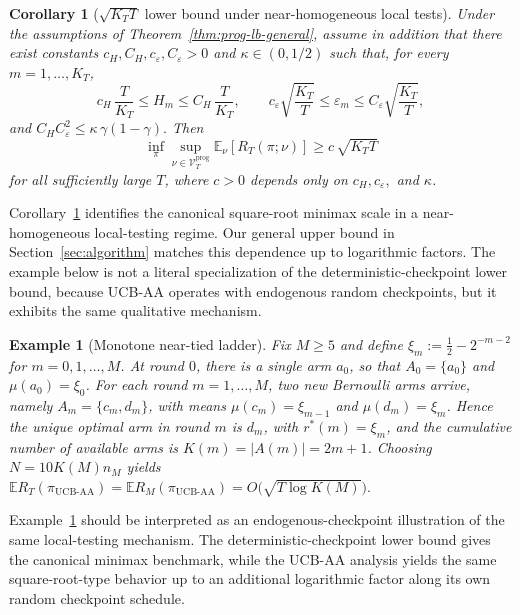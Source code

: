 \documentclass[11pt]{article}
\newtheorem{example}{Example}
\newtheorem{corollary}{Corollary}
\begin{document}
\begin{corollary}[$\sqrt{K_TT}$ lower bound under near-homogeneous local tests]
\label{cor:prog-lb-sqrtKT}
Under the assumptions of Theorem~\ref{thm:prog-lb-general}, assume in addition that there
exist constants $c_H,C_H,c_\varepsilon,C_\varepsilon>0$ and $\kappa\in(0,1/2)$ such that, for
every $m=1,\dots,K_T$,
\[
c_H\,\frac{T}{K_T}
\le
H_m
\le
C_H\,\frac{T}{K_T},
\qquad
c_\varepsilon\sqrt{\frac{K_T}{T}}
\le
\varepsilon_m
\le
C_\varepsilon\sqrt{\frac{K_T}{T}},
\]
and
\(
C_HC_\varepsilon^2\le \kappa\,\gamma(1-\gamma).
\)
Then
\[
\inf_\pi\sup_{\nu\in\mathcal V_T^{\mathrm{prog}}}
\mathbb E_\nu[R_T(\pi;\nu)]
\ge
c\,\sqrt{K_TT}
\]
for all sufficiently large $T$, where $c>0$ depends only on $c_H,c_\varepsilon,$ and $\kappa$.
\end{corollary}

Corollary~\ref{cor:prog-lb-sqrtKT} identifies the canonical square-root minimax scale in a
near-homogeneous local-testing regime. Our general upper bound in
Section~\ref{sec:algorithm} matches this dependence up to logarithmic factors. The example
below is not a literal specialization of the deterministic-checkpoint lower bound, because
UCB-AA operates with endogenous random checkpoints, but it exhibits the same qualitative
mechanism.


\begin{example}[Monotone near-tied ladder]
\label{exp:monotone-near-tied-ladder}
Fix $M\ge 5$ and define $\xi_m := \frac12 - 2^{-m-2}$ for $m=0,1,\dots,M$. At round $0$,
there is a single arm $a_0$, so that $A_0=\{a_0\}$ and $\mu(a_0)=\xi_0$. For each round
$m=1,\dots,M$, two new Bernoulli arms arrive, namely $A_m=\{c_m,d_m\}$, with means
$\mu(c_m)=\xi_{m-1}$ and $\mu(d_m)=\xi_m$. Hence the unique optimal arm in round $m$ is
$d_m$, with $r^*(m)=\xi_m$, and the cumulative number of available arms is
$K(m)=|A(m)|=2m+1$. Choosing $N=10K(M)n_M$ yields
\(
\mathbb E R_T(\pi_{\mathrm{UCB\text{-}AA}})
=
\mathbb E R_M(\pi_{\mathrm{UCB\text{-}AA}})
=
O\bigl(\sqrt{T\log K(M)}\bigr).
\)
\end{example}



Example~\ref{exp:monotone-near-tied-ladder} should be interpreted as an endogenous-checkpoint
illustration of the same local-testing mechanism. The deterministic-checkpoint lower bound gives
the canonical minimax benchmark, while the UCB-AA analysis yields the same square-root-type
behavior up to an additional logarithmic factor along its own random checkpoint schedule.
\end{document}
